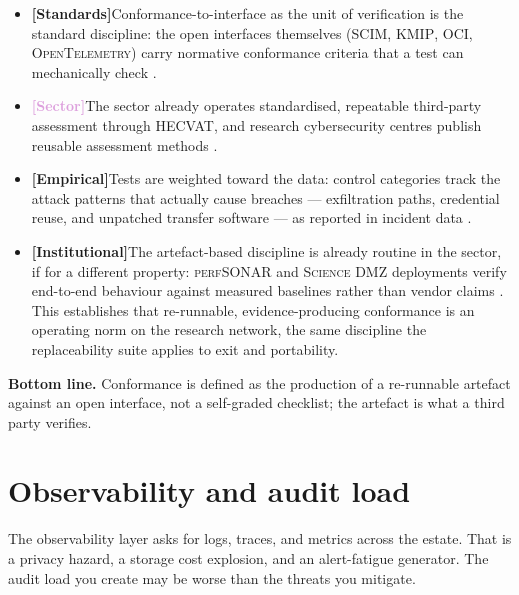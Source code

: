 \documentclass[11pt,a4paper,twoside]{book}
\let\citep\parencite
\newcommand{\institution}[1]{\textsc{#1}}
\newcommand{\evstd}{\textcolor{NavyBlue}{\textbf{[Standards]}}\space}
\newcommand{\evsector}{\textcolor{Plum}{\textbf{[Sector]}}\space}
\newcommand{\evempirical}{\textcolor{OliveGreen}{\textbf{[Empirical]}}\space}
\newcommand{\evinst}{\textcolor{Slate}{\textbf{[Institutional]}}\space}
\begin{document}
\begin{answerbox}[Response O6.1]
\begin{itemize}[leftmargin=1.4em,itemsep=2pt]
  \item \evstd Conformance-to-interface as the unit of verification is the
        standard discipline: the open interfaces themselves
        (\institution{SCIM}, \institution{KMIP}, \institution{OCI},
        \institution{OpenTelemetry}) carry normative conformance criteria
        that a test can mechanically check
        \citep{rfc-7643-scim-core,kmip-oasis,oci-image-spec,opentelemetry-spec}.
  \item \evsector The sector already operates standardised, repeatable
        third-party assessment through \institution{HECVAT}, and research
        cybersecurity centres publish reusable assessment methods
        \citep{hecvat,trustedci}.
  \item \evempirical Tests are weighted toward the data: control categories
        track the attack patterns that actually cause breaches --- exfiltration
        paths, credential reuse, and unpatched transfer software ---
        as reported in incident data
        \citep{verizon-dbir2024,moveit-breach}.
  \item \evinst The artefact-based discipline is already routine in the
        sector, if for a different property: \institution{perfSONAR} and
        \institution{Science DMZ} deployments verify end-to-end behaviour
        against measured baselines rather than vendor claims
        \citep{perfsonar,science-dmz-2013,sciencedmz-perf}. This establishes
        that re-runnable, evidence-producing conformance is an operating
        norm on the research network, the same discipline the replaceability
        suite applies to exit and portability.
\end{itemize}

\textbf{Bottom line.} Conformance is defined as the production of a
re-runnable artefact against an open interface, not a self-graded checklist;
the artefact is what a third party verifies.
\end{answerbox}

\section{Observability and audit load}
\label{sec:arg-observability}

\begin{questionbox}
The observability layer asks for logs, traces, and metrics across the estate.
That is a privacy hazard, a storage cost explosion, and an alert-fatigue
generator. The audit load you create may be worse than the threats you
mitigate.
\end{questionbox}
\end{document}
